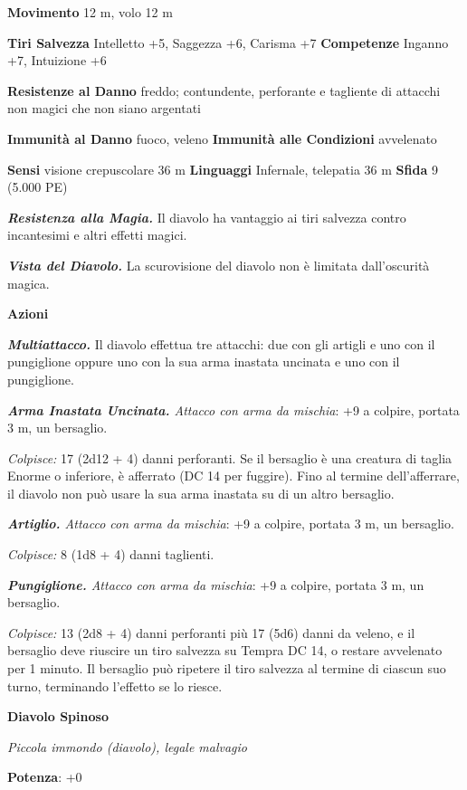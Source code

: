 \begin{multicols}{2}
\textbf{Movimento} 12 m, volo 12 m

\textbf{Tiri Salvezza} Intelletto +5, Saggezza +6, Carisma +7
\textbf{Competenze} Inganno +7, Intuizione +6

\textbf{Resistenze al Danno} freddo; contundente, perforante e tagliente
di attacchi non magici che non siano argentati

\textbf{Immunità al Danno} fuoco, veleno \textbf{Immunità alle
Condizioni} avvelenato

\textbf{Sensi} visione crepuscolare 36 m
\textbf{Linguaggi} Infernale, telepatia 36 m \textbf{Sfida} 9 (5.000 PE)

\emph{\textbf{Resistenza alla Magia.}} Il diavolo ha vantaggio ai tiri
salvezza contro incantesimi e altri effetti magici.

\emph{\textbf{Vista del Diavolo.}} La scurovisione del diavolo non è
limitata dall'oscurità magica.

\textbf{Azioni}

\emph{\textbf{Multiattacco.}} Il diavolo effettua tre attacchi: due con
gli artigli e uno con il pungiglione oppure uno con la sua arma inastata
uncinata e uno con il pungiglione.

\emph{\textbf{Arma Inastata Uncinata.} Attacco con arma da mischia}: +9
a colpire, portata 3 m, un bersaglio.

\emph{Colpisce:} 17 (2d12 + 4) danni perforanti. Se il bersaglio è una
creatura di taglia Enorme o inferiore, è afferrato (DC 14 per fuggire).
Fino al termine dell'afferrare, il diavolo non può usare la sua arma
inastata su di un altro bersaglio.

\emph{\textbf{Artiglio.} Attacco con arma da mischia}: +9 a colpire,
portata 3 m, un bersaglio.

\emph{Colpisce:} 8 (1d8 + 4) danni taglienti.

\emph{\textbf{Pungiglione.} Attacco con arma da mischia}: +9 a colpire,
portata 3 m, un bersaglio.

\emph{Colpisce:} 13 (2d8 + 4) danni perforanti più 17 (5d6) danni da
veleno, e il bersaglio deve riuscire un tiro salvezza su Tempra DC
14, o restare avvelenato per 1 minuto. Il bersaglio può ripetere il tiro
salvezza al termine di ciascun suo turno, terminando l'effetto se lo
riesce.

\textbf{Diavolo Spinoso}

\emph{Piccola immondo (diavolo), legale malvagio}

\textbf{Potenza}: +0


\end{multicols}
